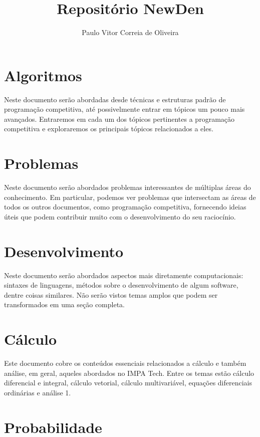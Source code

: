\documentclass[11pt, a4paper]{article}
\title{Repositório NewDen}
\author{Paulo Vitor Correia de Oliveira}
\date{}
\begin{document}
\maketitle

\void[-3.5]

\section{Algoritmos}

Neste documento serão abordadas desde técnicas e estruturas padrão de programação competitiva, até possivelmente entrar em tópicos um pouco mais avançados. Entraremos em cada um dos tópicos pertinentes a programação competitiva e exploraremos os principais tópicos relacionados a eles.

\section{Problemas}

Neste documento serão abordados problemas interessantes de múltiplas áreas do conhecimento. Em particular, podemos ver problemas que intersectam as áreas de todos os outros documentos, como programação competitiva, fornecendo ideias úteis que podem contribuir muito com o desenvolvimento do seu raciocínio.

\section{Desenvolvimento}

Neste documento serão abordados aspectos mais diretamente computacionais: sintaxes de linguagens, métodos sobre o desenvolvimento de algum software, dentre coisas similares. Não serão vistos temas amplos que podem ser transformados em uma seção completa.

\section{Cálculo}

Este documento cobre os conteúdos essenciais relacionados a cálculo e também análise, em geral, aqueles abordados no IMPA Tech. Entre os temas estão cálculo diferencial e integral, cálculo vetorial, cálculo multivariável, equações diferenciais ordinárias e análise 1.

\section{Probabilidade}
\end{document}
